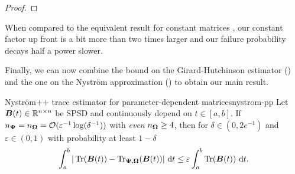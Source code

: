 \begin{proof}
\end{proof}

\color{black}


When compared to the equivalent result for constant matrices \cite[Lemma 3.2]{persson-2022-improved-variants}, our constant factor up front is a bit more than two times larger and our failure probability decays half a power slower.
 
Finally, we can now combine the bound on the Girard-Hutchinson estimator () and the one on the Nyström approximation () to obtain our main result.

\begin{theorem}{Nyström++ trace estimator for parameter-dependent matrices}{nystrom-pp}
    Let $\boldsymbol{B}(t) \in \mathbb{R}^{n \times n}$ be SPSD and continuously depend on $t \in [a, b]$. If $n_{\boldsymbol{\Psi}} = n_{\boldsymbol{\Omega}} = \mathcal{O}(\varepsilon^{-1} \log(\delta^{-1}))$ with \emph{even} $n_{\boldsymbol{\Omega}} \geq 4$, then for $\delta \in (0, 2e^{-1})$ and $\varepsilon \in (0, 1)$ with probability at least $1 - \delta$ 
    \begin{equation}
        \int_{a}^{b} | \operatorname{Tr}(\boldsymbol{B}(t)) - \operatorname{Tr}_{\boldsymbol{\Psi}, \boldsymbol{\Omega}}(\boldsymbol{B}(t)) |~\mathrm{d}t
        \leq \varepsilon \int_{a}^{b} \operatorname{Tr}(\boldsymbol{B}(t))~\mathrm{d}t.
    \end{equation}
\end{theorem}

